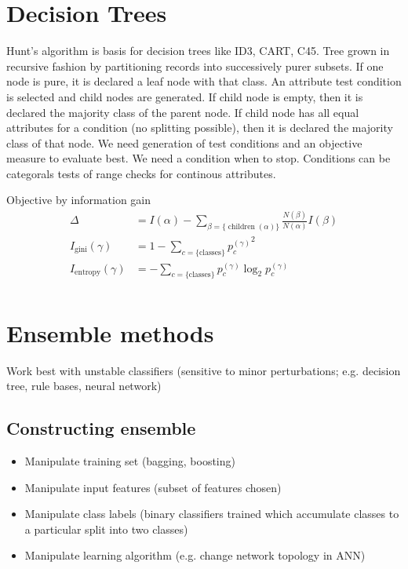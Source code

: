\documentclass{article}
\begin{document}

\section{Decision Trees}
Hunt's algorithm is basis for decision trees like ID3, CART, C45. Tree grown in recursive fashion by partitioning records into successively purer subsets. If one node is pure, it is declared a leaf node with that class. An attribute test condition is selected and child nodes are generated. If child node is empty, then it is declared the majority class of the parent node. If child node has all equal attributes for a condition (no splitting  possible), then it is declared the majority class of that node. We need generation of test conditions and an objective measure to evaluate best. We need a condition when to stop. Conditions can be categorals tests of range checks for continous attributes.

Objective by information gain
\begin{align*}
\Delta&=I(\alpha)-\sum_{\beta=\{\operatorname{children}(\alpha)\}}\frac{N(\beta)}{N(\alpha)}I(\beta)\\
I_\text{gini}(\gamma)&=1-\sum_{c=\{\text{classes}\}} {p^{(\gamma)}_c}^2\\
I_\text{entropy}(\gamma)&=-\sum_{c=\{\text{classes}\}} p^{(\gamma)}_c\log_2{p^{(\gamma)}_c}\\
\end{align*}

\section{Ensemble methods}
Work best with unstable classifiers (sensitive to minor perturbations; e.g. decision tree, rule bases, neural network)
\subsection{Constructing ensemble}
\begin{itemize}
\item Manipulate training set (bagging, boosting)
\item Manipulate input features (subset of features chosen)
\item Manipulate class labels (binary classifiers trained which accumulate classes to a particular split into two classes)
\item Manipulate learning algorithm (e.g. change network topology in ANN)
\end{itemize}
\end{document}
